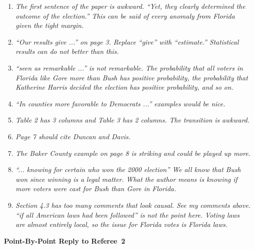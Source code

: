 \documentclass[11pt]{article}
\begin{document}
\bigskip
{}

\begin{enumerate}
\item {\it The first sentence of the paper is awkward.  ``Yet, they
    clearly determined the outcome of the election.'' This can be said
    of every anomaly from Florida given the tight margin.}
  
\item {\it ``Our results give ...'' on page 3.  Replace ``give'' with
    ``estimate.'' Statistical results can do not better than this.}
  
\item {\it ``seen as remarkable ...'' is not remarkable.  The
    probability that all voters in Florida like Gore more than Bush
    has positive probability, the probability that Katherine Harris
    decided the election has positive probability, and so on.}
  
\item {\it ``In counties more favorable to Democrats ...'' examples
    would be nice.}
  
\item {\it Table 2 has 3 columns and Table 3 has 2 columns.  The
    transition is awkward.}
  
\item {\it Page 7 should cite Duncan and Davis.}
  
\item {\it The Baker County example on page 8 is striking and could be
    played up more.}
  
\item {\it ``... knowing for certain who won the 2000 election'' We
    all know that Bush won since winning is a legal matter.  What the
    author means is knowing if more voters were cast for Bush than
    Gore in Florida.}
  
\item {\it Section 4.3 has too many comments that look causal.  See my
    comments above.  ``if all American laws had been followed'' is not
    the point here.  Voting laws are almost entirely local, so the
    issue for Florida votes is Florida laws.}


\end{enumerate}


\clearpage
\begin{center}
  {\bf \Large Point-By-Point Reply to Referee~2}
\end{center}
\end{document}
